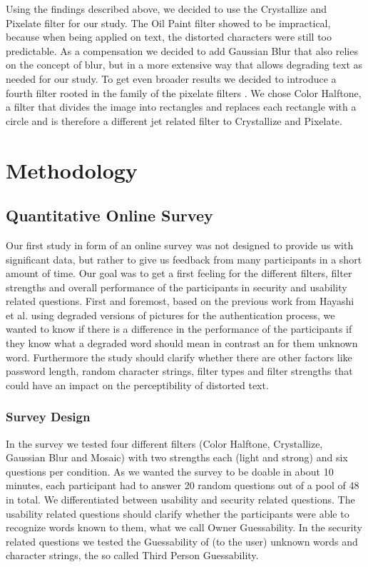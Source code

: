 \documentclass{sigchi}
\begin{document}
Using the findings described above, we decided to use the Crystallize and Pixelate filter for our study. The Oil Paint filter showed to be impractical, because when being applied on text, the distorted characters were still too predictable. As a compensation we decided to add Gaussian Blur that also relies on the concept of blur, but in a more extensive way that allows degrading text as needed for our study. To get even broader results we decided to introduce a fourth filter rooted in the family of the pixelate filters \cite{pixelatefilters}. We chose Color Halftone, a filter that divides the image into rectangles and replaces each rectangle with a circle and is therefore a different jet related filter to Crystallize and Pixelate.

\section{Methodology}

\subsection{Quantitative Online Survey}
Our first study in form of an online survey was not designed to provide us with significant data, but rather to give us feedback from many participants in a short amount of time. Our goal was to get a first feeling for the different filters, filter strengths and overall performance of the participants in security and usability related questions. 
First and foremost, based on the previous work from Hayashi et al. \cite{hayashi2008use} using degraded versions of pictures for the authentication process, we wanted to know if there is a difference in the performance of the participants if they know what a degraded word should mean in contrast an for them unknown word. Furthermore the study should clarify whether there are other factors like password length, random character strings, filter types and filter strengths that could have an impact on the perceptibility of distorted text.

\subsubsection{Survey Design}
In the survey we tested four different filters (Color Halftone, Crystallize, Gaussian Blur and Mosaic) with two strengths each (light and strong) and six questions per condition. As we wanted the survey to be doable in about 10 minutes, each participant had to answer 20 random questions out of a pool of 48 in total. 
We differentiated between usability and security related questions. The usability related questions should clarify whether the participants were able to recognize words known to them, what we call Owner Guessability.
In the security related questions we tested the Guessability of (to the user) unknown words and character strings, the so called Third Person Guessability.
\end{document}
